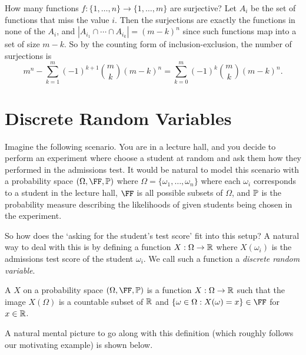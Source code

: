\documentclass[a4paper]{scrartcl}
\begin{document}
\begin{example}
	How many functions $f : \{1, \dots, n\} \rightarrow \{1, \dots, m\}$ are surjective? Let $A_i$ be the set of functions that miss the value $i$. Then the surjections are exactly the functions in none of the $A_i$, and $|A_{i_1} \cap \cdots \cap A_{i_k}| = (m - k)^n$ since such functions map into a set of size $m - k$. So by the counting form of inclusion-exclusion, the number of surjections is
	$$
	m^n - \sum_{k = 1}^{m} (-1)^{k + 1} \binom{m}{k}(m - k)^n = \sum_{k = 0}^{m} (-1)^k \binom{m}{k} (m - k)^n.
	$$
\end{example}


\section{Discrete Random Variables}

Imagine the following scenario. You are in a lecture hall, and you decide to perform an experiment where choose a student at random and ask them how they performed in the admissions test. It would be natural to model this scenario with a probability space $(\Omega, \FF, \PP)$ where $\Omega = \{\omega_1, \dots, \omega_n\}$ where each $\omega_i$ corresponds to a student in the lecture hall, $\FF$ is all possible subsets of $\Omega$, and $\mathbb{P}$ is the probability measure describing the likelihoods of given students being chosen in the experiment.

So how does the `asking for the student's test score' fit into this setup? A natural way to deal with this is by defining a function $X : \Omega \rightarrow \mathbb{R}$ where $X(\omega_i)$ is the admissions test score of the student $\omega_i$. We call such a function a \emph{discrete random variable}. 

\begin{definition}
	A  $X$ on a probability space $(\Omega, \FF, \PP)$ is a function $X : \Omega \rightarrow \mathbb{R}$ such that the image $X(\Omega)$ is a countable subset of $\mathbb{R}$ and $\{ \omega \in \Omega : X(\omega) = x \} \in \FF$ for $x \in \mathbb{R}$.
\end{definition}

A natural mental picture to go along with this definition (which roughly follows our motivating example) is shown below.
\end{document}
